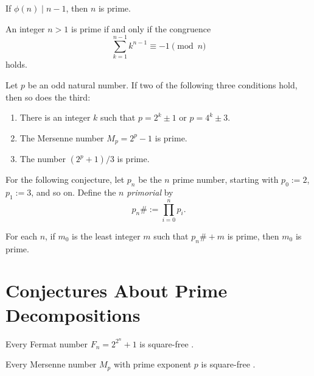 \begin{conjecture}
  If $\phi(n)\mid n-1$, then $n$ is prime.
\end{conjecture}

\begin{conjecture}
  An integer $n>1$ is prime if and only if the congruence
  \begin{equation*}
    \sum_{k=1}^{n-1} k^{n-1} \equiv -1\pmod{n}
  \end{equation*}
  holds.
\end{conjecture}

\begin{conjecture}
  Let $p$ be an odd natural number. If two of the following three conditions hold, then so does the third:
  \begin{enumerate}
  \item There is an integer $k$ such that $p=2^k\pm 1$ or $p=4^k\pm 3$.
  \item The Mersenne number $M_p=2^p-1$ is prime.
  \item The number $(2^p+1)/3$ is prime.
  \end{enumerate}
\end{conjecture}

For the following conjecture, let $p_n$ be the $n$\supth{} prime number, starting with $p_0:=2$, $p_1:=3$, and so on. Define the $n$\supth{} \emph{primorial} by
\begin{equation*}
  p_n\# := \prod_{i=0}^n p_i.
\end{equation*}

\begin{conjecture}
  For each $n$, if $m_0$ is the least integer $m$ such that $p_n\#+m$ is prime, then $m_0$ is prime.
\end{conjecture}

\section{Conjectures About Prime Decompositions}

\begin{conjecture}
  Every Fermat number $F_n=2^{2^n}+1$ is square-free \cite{braywarren1967}.
\end{conjecture}

\begin{conjecture}
  Every Mersenne number $M_p$ with prime exponent $p$ is square-free \cite{rotkiewicz1965,braywarren1967}.
\end{conjecture}

